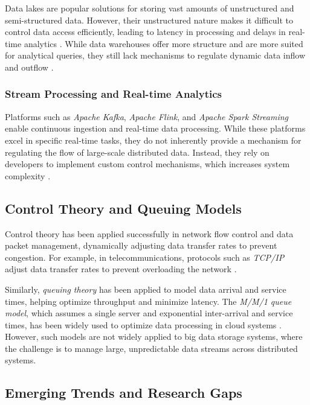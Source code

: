 Data lakes are popular solutions for storing vast amounts of unstructured and semi-structured data. However, their unstructured nature makes it difficult to control data access efficiently, leading to latency in processing and delays in real-time analytics \cite{nambiar2022overview}. While data warehouses offer more structure and are more suited for analytical queries, they still lack mechanisms to regulate dynamic data inflow and outflow \cite{bai2023data}.

\subsubsection{Stream Processing and Real-time Analytics}

Platforms such as \textit{Apache Kafka}, \textit{Apache Flink}, and \textit{Apache Spark Streaming} enable continuous ingestion and real-time data processing. While these platforms excel in specific real-time tasks, they do not inherently provide a mechanism for regulating the flow of large-scale distributed data. Instead, they rely on developers to implement custom control mechanisms, which increases system complexity \cite{fernandes2020big,bai2023data,saxena2017practical}.

\subsection{Control Theory and Queuing Models}

Control theory has been applied successfully in network flow control and data packet management, dynamically adjusting data transfer rates to prevent congestion. For example, in telecommunications, protocols such as \textit{TCP/IP} adjust data transfer rates to prevent overloading the network \cite{collis2004issues}.

Similarly, \textit{queuing theory} has been applied to model data arrival and service times, helping optimize throughput and minimize latency. The \textit{M/M/1 queue model}, which assumes a single server and exponential inter-arrival and service times, has been widely used to optimize data processing in cloud systems \cite{guo2014dynamic}. However, such models are not widely applied to big data storage systems, where the challenge is to manage large, unpredictable data streams across distributed systems.

\subsection{Emerging Trends and Research Gaps}

